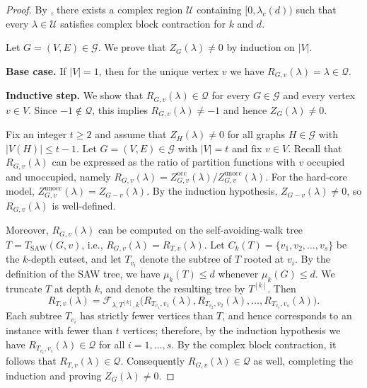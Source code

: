 \documentclass[a4paper,11pt]{article}
\theoremstyle{plain}
\theoremstyle{definition}
\theoremstyle{remark}
\newcommand{\1}{\mathbf{1}}
\begin{document}
\begin{proof}
By , there exists a complex region
$\mathcal{U}$ containing $[0,\lambda_c(d))$ such that every $\lambda\in\mathcal{U}$
satisfies complex block contraction for $k$ and $d$.

Let $G=(V,E)\in\mathcal{G}$. We prove that $Z_G(\lambda)\neq 0$ by induction on $|V|$.

\smallskip
\noindent\textbf{Base case.}
If $|V|=1$, then for the unique vertex $v$ we have $R_{G,v}(\lambda)=\lambda\in\mathcal{Q}$.

\smallskip
\noindent\textbf{Inductive step.}
We show that $R_{G,v}(\lambda)\in\mathcal{Q}$ for every $G\in\mathcal{G}$ and every vertex $v\in V$.
Since $-1\notin\mathcal{Q}$, this implies $R_{G,v}(\lambda)\neq -1$ and hence $Z_G(\lambda)\neq 0$.

Fix an integer $t\ge 2$ and assume that $Z_H(\lambda)\neq 0$ for all graphs $H\in\mathcal{G}$ with $|V(H)|\le t-1$.
Let $G=(V,E)\in\mathcal{G}$ with $|V|=t$ and fix $v\in V$.
Recall that $R_{G,v}(\lambda)$ can be expressed as the ratio of partition functions with $v$ occupied and unoccupied,
namely $R_{G,v}(\lambda)=Z^{\mathrm{occ}}_{G,v}(\lambda)/Z^{\mathrm{unocc}}_{G,v}(\lambda)$.
For the hard-core model, $Z^{\mathrm{unocc}}_{G,v}(\lambda)=Z_{G-v}(\lambda)$.
By the induction hypothesis, $Z_{G-v}(\lambda)\neq 0$, so $R_{G,v}(\lambda)$ is well-defined.

Moreover, $R_{G,v}(\lambda)$ can be computed on the self-avoiding-walk tree $T=T_{\mathrm{SAW}}(G,v)$, i.e.,
$R_{G,v}(\lambda)=R_{T,v}(\lambda)$.
Let $C_k(T)=\{v_1,v_2,\dots,v_s\}$ be the $k$-depth cutset, and let $T_{v_i}$ denote the subtree of $T$ rooted at $v_i$.
By the definition of the SAW tree, we have $\mu_k(T)\le d$ whenever $\mu_k(G)\le d$. We truncate $T$ at depth $k$, and denote the resulting tree by $T^{[k]}$.
Then
\[
R_{T,v}(\lambda)
= \mathcal{F}_{\lambda,T^{[k]},k}\bigl(R_{T_{v_1},v_1}(\lambda),R_{T_{v_2},v_2}(\lambda),\dots,R_{T_{v_s},v_s}(\lambda)\bigr).
\]
Each subtree $T_{v_i}$ has strictly fewer vertices than $T$, and hence corresponds to an instance with fewer than $t$ vertices;
therefore, by the induction hypothesis we have $R_{T_{v_i},v_i}(\lambda)\in\mathcal{Q}$ for all $i=1,\dots,s$.
By the complex block contraction, it follows that $R_{T,v}(\lambda)\in\mathcal{Q}$.
Consequently $R_{G,v}(\lambda)\in\mathcal{Q}$ as well, completing the induction and proving $Z_G(\lambda)\neq 0$.
\end{proof}
\end{document}
